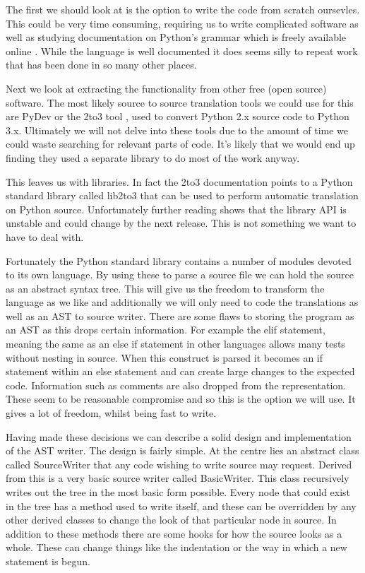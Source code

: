 \documentclass{report}
\begin{document}
The first we should look at is the option to write the code from scratch oursevles. This could be very time consuming, requiring
us to write complicated software as well as studying documentation on Python's grammar which is freely available online \cite{pygrammar}.
While the language is well documented it does seems silly to repeat work that has been done in so many other places.

Next we look at extracting the functionality from other free (open source) software. The most likely source to source translation tools
we could use for this are PyDev or the 2to3 tool \cite{2to3}, used to convert Python 2.x source code to Python 3.x. Ultimately we will not
delve into these tools due to the amount of time we could waste searching for relevant parts of code. It's likely that we
would end up finding they used a separate library to do most of the work anyway.

This leaves us with libraries. In fact the 2to3 documentation points to a Python standard library called lib2to3 that can be used to
perform automatic translation on Python source. Unfortunately further reading shows that the library API is unstable and could change by
the next release. This is not something we want to have to deal with.

Fortunately the Python standard library contains a number of modules devoted to its own language. By using these to parse a source file
we can hold the source as an abstract syntax tree. This will give us the freedom to transform the language as we like and additionally we will only need
to code the translations as well as an AST to source writer. There are some flaws to storing the program as an AST as this drops certain information.
For example the elif statement, meaning the same as an else if statement in other languages allows many tests without nesting in source.
When this construct is parsed it becomes an if statement within an else statement and can create large changes to the expected code. Information
such as comments are also dropped from the representation. These seem to be reasonable compromise and so this is the option we will use. It gives
a lot of freedom, whilst being fast to write.

Having made these decisions we can describe a solid design and implementation of the AST writer. The design is fairly simple.
At the centre lies an abstract class called SourceWriter that any code wishing to write source may request. Derived from this
is a very basic source writer called BasicWriter. This class recursively writes out the tree in the
most basic form possible. Every node that could exist in the tree has a method used to write itself, and these can be overridden by any
other derived classes to change the look of that particular node in source. In addition to these methods there are some hooks for how
the source looks as a whole. These can change things like the indentation or the way in which a new statement is begun.
\end{document}
